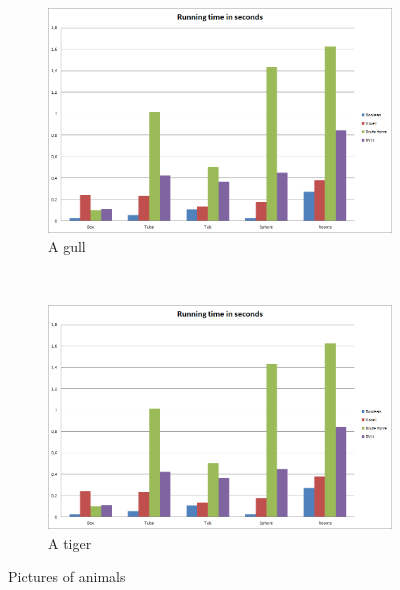 \documentclass[11pt,twoside,a4paper]{report}
\begin{document}
\begin{figure}[h]
        \centering
        \begin{subfigure}[h]{0.3\textwidth}
                \includegraphics[width=\textwidth]{images/running_time_seconds}
                \caption{A gull}
                \label{fig:gull}
        \end{subfigure}%
        ~ %
        \begin{subfigure}[h]{0.3\textwidth}
                \includegraphics[width=\textwidth]{images/running_time_seconds}
                \caption{A tiger}
                \label{fig:tiger}
        \end{subfigure}
        \caption{Pictures of animals}\label{fig:animals}
\end{figure}
\end{document}
